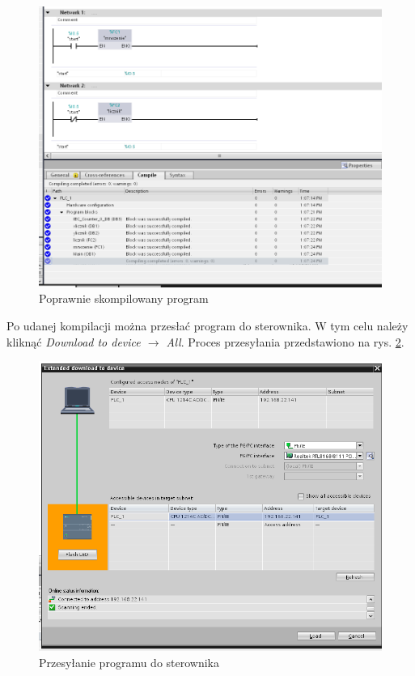 \documentclass[12pt]{article}
\begin{document}
\begin{figure}[H]
    \centering
    \includegraphics[width=\textwidth]{./zdj/kompilacja.png}
    \caption{Poprawnie skompilowany program}
    \label{kompilacja}
\end{figure} 

Po udanej kompilacji można przesłać program do sterownika. W tym celu należy kliknąć \textit{Download to device $\rightarrow$ All}. Proces przesyłania przedstawiono na rys. \ref{przesylanie}.

\begin{figure}[H]
    \centering
    \includegraphics[width=\textwidth]{./zdj/przesylanie.png}
    \caption{Przesyłanie programu do sterownika}
    \label{przesylanie}
\end{figure} 
\end{document}
